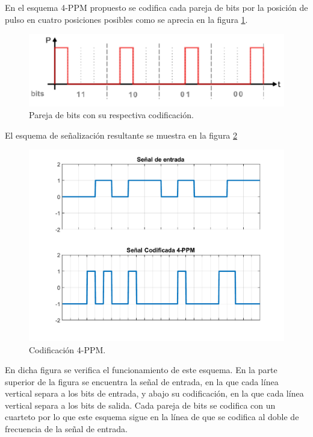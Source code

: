 En el esquema 4-PPM propuesto se codifica cada pareja de bits
por la posición de pulso en cuatro posiciones posibles como se aprecia en la figura
\ref{bits4ppm}.

\begin{figure}[ht]
    \centering
    \includegraphics[scale=0.5]{./figuras/opciones4PPM.png}%
    \caption{\small{Pareja de bits con su respectiva codificación.}}
    \label{bits4ppm}%
\end{figure}

El esquema de señalización resultante se muestra en la figura \ref{cod4ppm}
\begin{figure}[ht]
    \centering
    \includegraphics[scale=0.5]{./figuras/CodificadaPPM.pdf}%
    \caption{\small{Codificación 4-PPM.}}
    \label{cod4ppm}%
\end{figure}

En dicha figura se verifica el funcionamiento de este esquema. En la parte superior de la 
figura se encuentra la señal de entrada, en la que cada línea vertical separa a los bits
de entrada, y abajo su codificación, en la que cada línea vertical separa a los bits de 
salida. Cada pareja de bits se codifica con un cuarteto por lo que este esquema sigue en 
la línea de que se codifica al doble de frecuencia de la señal de entrada.

